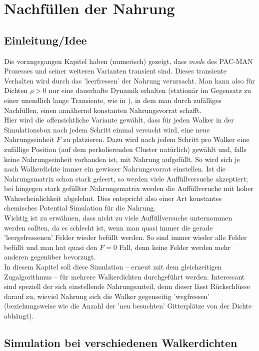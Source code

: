 \documentclass[a4paper, 12pt]{report}
\begin{document}
\chapter{Nachfüllen der Nahrung}

\section{Einleitung/Idee}

Die vorangegangen Kapitel haben (numerisch) gezeigt, dass $msd$s des PAC-MAN Prozesses und seiner weiteren Varianten transient sind. Dieses transiente Verhalten wird durch das 'leerfressen' der Nahrung verursacht. Man kann also für Dichten $\rho > 0$ nur eine dauerhafte Dynamik erhalten (stationär im Gegensatz zu einer unendlich lange Transiente, wie in \cite{doi:10.1063/1.4999485}), in dem man durch zufälliges Nachfüllen, einen annähernd konstanten Nahrungsvorrat schafft.
\\
Hier wird die offensichtliche Variante gewählt, dass für jeden Walker in der Simulationsbox nach jedem Schritt einmal versucht wird, eine neue Nahrungseinheit $F$ zu platzieren. Dazu wird nach jedem Schritt pro Walker eine zufällige Position (auf dem perkolierenden Cluster natürlich) gewählt und, falls keine Nahrungseinheit vorhanden ist, mit Nahrung aufgefüllt. So wird sich je nach Walkerdichte immer ein gewisser Nahrungsvorrat einstellen. Ist die Nahrungsmatrix schon stark geleert, so werden viele Auffüllversuche akzeptiert; bei hingegen stark gefüllter Nahrungsmatrix werden die Auffüllveruche mit hoher Wahrscheinlichkeit abgelehnt. Dies entspricht also einer Art konstantes chemisches Potential Simulation für die Nahrung.
\\
Wichtig ist zu erwähnen, dass nicht zu viele Auffüllversuche unternommen werden sollten, da es schlecht ist, wenn man quasi immer die gerade 'leergefressenen' Felder wieder befüllt werden. So sind immer wieder alle Felder befüllt und man hat quasi den $F=0$ Fall, denn keine Felder werden mehr anderen gegenüber bevorzugt.
\\
In diesem Kapitel soll diese Simulation -- erneut mit dem gleichzeitigen Zug\-algorithmus -- für mehrere Walkerdichten durchgeführt werden. Interessant sind speziell der sich einstellende Nahrungsanteil, denn dieser lässt Rückschlüsse darauf zu, wieviel Nahrung sich die Walker gegenseitig 'wegfressen' (beziehungsweise wie die Anzahl der 'neu besuchten' Gitterplätze von der Dichte abhängt).

\section{Simulation bei verschiedenen Walkerdichten}
\end{document}
